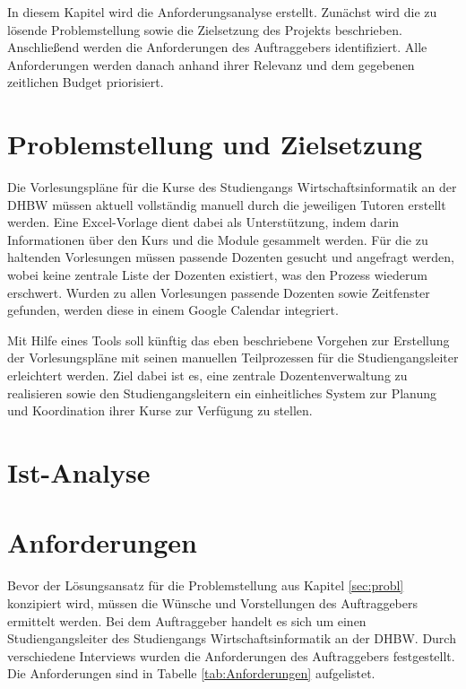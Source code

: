 \label{ch:Anforderungsanalyse}

In diesem Kapitel wird die Anforderungsanalyse erstellt.
Zunächst wird die zu lösende Problemstellung sowie die Zielsetzung des Projekts beschrieben.
Anschließend werden die Anforderungen des Auftraggebers identifiziert.
Alle Anforderungen werden danach anhand ihrer Relevanz und dem gegebenen zeitlichen Budget priorisiert.


\section{Problemstellung und Zielsetzung}\label{sec:probl}

Die Vorlesungspläne für die Kurse des Studiengangs Wirtschaftsinformatik an der \ac{DHBW} müssen aktuell vollständig manuell durch die jeweiligen Tutoren erstellt werden.
Eine Excel-Vorlage dient dabei als Unterstützung, indem darin Informationen über den Kurs und die Module gesammelt werden.
Für die zu haltenden Vorlesungen müssen passende Dozenten gesucht und angefragt werden, wobei keine zentrale Liste der Dozenten existiert, was den Prozess wiederum erschwert.
Wurden zu allen Vorlesungen passende Dozenten sowie Zeitfenster gefunden, werden diese in einem Google Calendar integriert.

Mit Hilfe eines Tools soll künftig das eben beschriebene Vorgehen zur Erstellung der Vorlesungspläne mit seinen manuellen Teilprozessen für die Studiengangsleiter erleichtert werden.
Ziel dabei ist es, eine zentrale Dozentenverwaltung zu realisieren sowie den Studiengangsleitern ein einheitliches System zur Planung und Koordination ihrer Kurse zur Verfügung zu stellen.

\section{Ist-Analyse}


\section{Anforderungen}

Bevor der Lösungsansatz für die Problemstellung aus Kapitel \vref{sec:probl} konzipiert wird, müssen die Wünsche und Vorstellungen des Auftraggebers ermittelt werden.
Bei dem Auftraggeber handelt es sich um einen Studiengangsleiter des Studiengangs Wirtschaftsinformatik an der \ac{DHBW}.
Durch verschiedene Interviews wurden die Anforderungen des Auftraggebers festgestellt.
Die Anforderungen sind in Tabelle \ref{tab:Anforderungen} aufgelistet.

